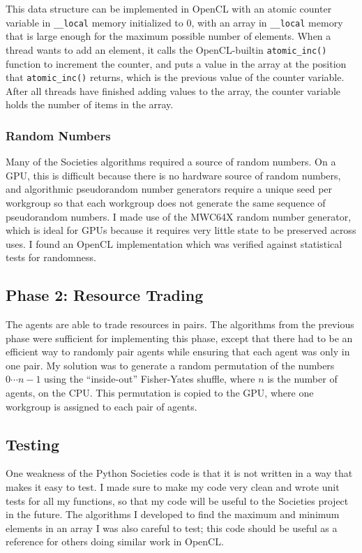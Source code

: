 \documentclass{article}
\begin{document}
This data structure can be implemented in OpenCL with an atomic counter variable in \texttt{\_\_local} memory initialized to 0, with an array in \texttt{\_\_local} memory that is large enough for the maximum possible number of elements. When a thread wants to add an element, it calls the OpenCL-builtin \texttt{atomic\_inc()} function to increment the counter, and puts a value in the array at the position that \texttt{atomic\_inc()} returns, which is the previous value of the counter variable. After all threads have finished adding values to the array, the counter variable holds the number of items in the array.

\subsubsection{Random Numbers}
Many of the Societies algorithms required a source of random numbers. On a GPU, this is difficult because there is no hardware source of random numbers, and algorithmic pseudorandom number generators require a unique seed per workgroup so that each workgroup does not generate the same sequence of pseudorandom numbers. I made use of the MWC64X random number generator, which is ideal for GPUs because it requires very little state to be preserved across uses. I found an OpenCL implementation which was verified against statistical tests for randomness.\cite{mwc64x}

\subsection{Phase 2: Resource Trading}
The agents are able to trade resources in pairs. The algorithms from the previous phase were sufficient for implementing this phase, except that there had to be an efficient way to randomly pair agents while ensuring that each agent was only in one pair. My solution was to generate a random permutation of the numbers $0 \cdots n-1$ using the ``inside-out'' Fisher-Yates shuffle, where $n$ is the number of agents, on the CPU. This permutation is copied to the GPU, where one workgroup is assigned to each pair of agents.

\subsection{Testing}
One weakness of the Python Societies code is that it is not written in a way that makes it easy to test. I made sure to make my code very clean  and wrote unit tests for all my functions, so that my code will be useful to the Societies project in the future. The algorithms I developed to find the maximum and minimum elements in an array I was also careful to test; this code should be useful as a reference for others doing similar work in OpenCL.
\end{document}
